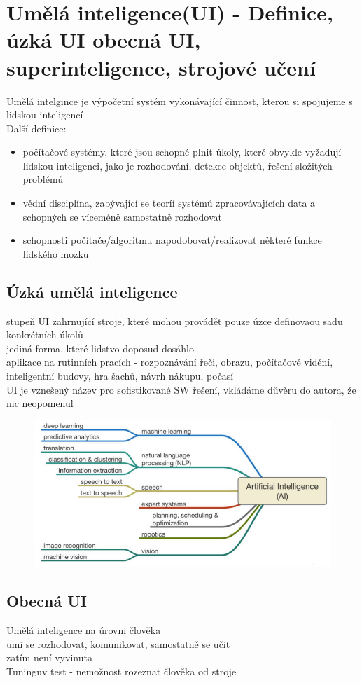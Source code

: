 
\section{Umělá inteligence(UI) - Definice, úzká UI obecná UI, superinteligence, strojové učení}
Umělá intelgince je výpočetní systém vykonávající činnost, kterou si spojujeme s lidskou inteligencí\\
Další definice: 
\begin{itemize}
    \item počítačové systémy, které jsou schopné plnit úkoly, které obvykle vyžadují lidskou inteligenci, jako je rozhodování, detekce objektů, řešení složitých problémů
    \item vědní disciplína, zabývající se teoríí systémů zpracovávajících data a schopných se víceméně samostatně rozhodovat
    \item schopnosti počítače/algoritmu napodobovat/realizovat některé funkce lidského mozku
\end{itemize}
\subsection*{Úzká umělá inteligence}
stupeň UI zahrnující stroje, které mohou provádět pouze úzce definovaou sadu konkrétních úkolů\\
jediná forma, které lidstvo doposud dosáhlo\\
aplikace na rutinních pracích - rozpoznávání řeči, obrazu, počítačové vidění, inteligentní budovy, hra šachů, návrh nákupu, počasí\\
UI je vznešený název pro sofistikované SW řešení, vkládáme důvěru do autora, že nic neopomenul\\
\begin{figure}[H]
    \includegraphics[scale = 1]{images/uzkeAI.png}
\end{figure}
\subsection*{Obecná UI}
Umělá inteligence na úrovni člověka\\
umí se rozhodovat, komunikovat, samostatně se učit\\
zatím není vyvinuta\\
Tuninguv test - nemožnost rozeznat člověka od stroje\\

